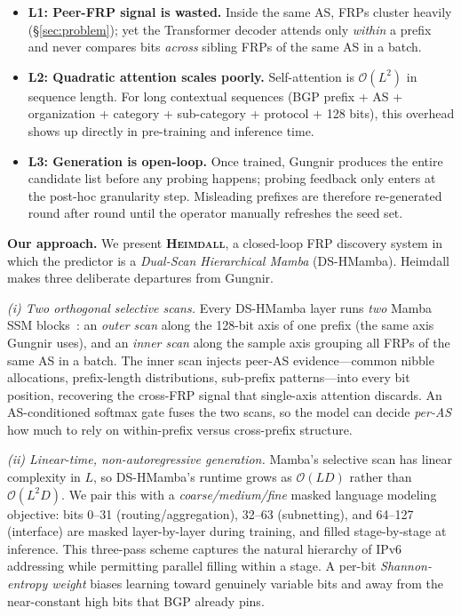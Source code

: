 \documentclass[conference]{IEEEtran}
\begin{document}
\begin{itemize}
\item \textbf{L1: Peer-FRP signal is wasted.}  Inside the same AS,
      FRPs cluster heavily (\S\ref{sec:problem}); yet the Transformer
      decoder attends only \emph{within} a prefix and never compares
      bits \emph{across} sibling FRPs of the same AS in a batch.
\item \textbf{L2: Quadratic attention scales poorly.}  Self-attention
      is $\mathcal{O}(L^{2})$ in sequence length.  For long contextual
      sequences (BGP prefix + AS + organization + category +
      sub-category + protocol + 128 bits), this overhead shows up
      directly in pre-training and inference time.
\item \textbf{L3: Generation is open-loop.}  Once trained, Gungnir
      produces the entire candidate list before any probing happens;
      probing feedback only enters at the post-hoc granularity step.
      Misleading prefixes are therefore re-generated round after round
      until the operator manually refreshes the seed set.
\end{itemize}

\noindent\textbf{Our approach.}  We present \textbf{\textsc{Heimdall}}, a
closed-loop FRP discovery system in which the predictor is a
\emph{Dual-Scan Hierarchical Mamba} (DS-HMamba).  Heimdall makes three
deliberate departures from Gungnir.

\emph{(i) Two orthogonal selective scans.}  Every DS-HMamba layer runs
\emph{two} Mamba SSM blocks~\cite{gu2023mamba}: an \emph{outer scan}
along the 128-bit axis of one prefix (the same axis Gungnir uses), and
an \emph{inner scan} along the sample axis grouping all FRPs of the
same AS in a batch.  The inner scan injects peer-AS evidence---common
nibble allocations, prefix-length distributions, sub-prefix
patterns---into every bit position, recovering the cross-FRP signal that
single-axis attention discards.  An AS-conditioned softmax gate fuses
the two scans, so the model can decide \emph{per-AS} how much to rely on
within-prefix versus cross-prefix structure.

\emph{(ii) Linear-time, non-autoregressive generation.}  Mamba's
selective scan has linear complexity in $L$, so DS-HMamba's runtime
grows as $\mathcal{O}(LD)$ rather than $\mathcal{O}(L^{2}D)$.  We pair
this with a \emph{coarse/medium/fine} masked language modeling
objective: bits 0--31 (routing/aggregation), 32--63 (subnetting), and
64--127 (interface) are masked layer-by-layer during training, and
filled stage-by-stage at inference.  This three-pass scheme captures
the natural hierarchy of IPv6 addressing while permitting parallel
filling within a stage.  A per-bit \emph{Shannon-entropy weight}
biases learning toward genuinely variable bits and away from the
near-constant high bits that BGP already pins.
\end{document}

